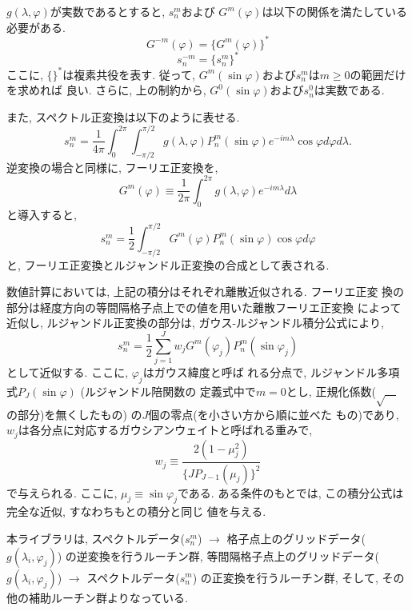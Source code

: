 \documentclass[a4j]{jarticle}
\begin{document}
$g(\lambda,\varphi)$が実数であるとすると, $s^m_n$および
$G^m(\varphi)$は以下の関係を満たしている必要がある.
\begin{equation}
G^{-m}(\varphi)=\{G^m(\varphi)\}^{*}
\end{equation}
\begin{equation}
s^{-m}_n=\{s^m_n\}^{*}
\end{equation}
ここに, $\{ \}^{*}$は複素共役を表す.
従って, $G^m(\sin\varphi)$および$s^m_n$は$m\ge 0$の範囲だけを求めれば
良い. さらに, 上の制約から, $G^0(\sin\varphi)$および$s^0_n$は実数である.

また, スペクトル正変換は以下のように表せる.
\begin{equation}
s^m_n=\frac1{4\pi}\int^{2\pi}_0\int^{\pi/2}_{-\pi/2}
g(\lambda,\varphi)P^m_n(\sin\varphi)e^{-im\lambda}\cos\varphi d\varphi
d\lambda .
\end{equation}
逆変換の場合と同様に, フーリエ正変換を,
\begin{equation}
G^m(\varphi)\equiv\frac1{2\pi}\int^{2\pi}_0
g(\lambda,\varphi)e^{-im\lambda}d\lambda
\end{equation}
と導入すると, 
\begin{equation}
s^m_n=\frac12\int^{\pi/2}_{-\pi/2}G^m(\varphi)P^m_n(\sin\varphi)\cos\varphi
d\varphi
\end{equation}
と, フーリエ正変換とルジャンドル正変換の合成として表される.

数値計算においては, 上記の積分はそれぞれ離散近似される. フーリエ正変
換の部分は経度方向の等間隔格子点上での値を用いた離散フーリエ正変換
によって近似し,
ルジャンドル正変換の部分は, ガウス-ルジャンドル積分公式により,
\begin{equation}
s^m_n=\frac12\sum^J_{j=1}w_jG^m(\varphi_j)P^m_n(\sin\varphi_j)
\end{equation}
として近似する. ここに, $\varphi_j$はガウス緯度と呼ば
れる分点で, ルジャンドル多項式$P_J(\sin\varphi)$ (ルジャンドル陪関数の
定義式中で$m=0$とし, 正規化係数($\sqrt{\quad}$の部分)を無くしたもの)
の$J$個の零点(を小さい方から順に並べた
もの)であり, $w_j$は各分点に対応するガウシアンウェイトと呼ばれる重みで,
\begin{equation}
w_j\equiv\frac{2(1-\mu_j^2)}{\{JP_{J-1}(\mu_j)\}^2}
\end{equation}
で与えられる. ここに, $\mu_j\equiv\sin\varphi_j$である.
ある条件のもとでは, この積分公式は完全な近似, すなわちもとの積分と同じ
値を与える.

本ライブラリは, 
スペクトルデータ($s^m_n$) 
$\to$ 格子点上のグリッドデータ($g(\lambda_i,\varphi_j)$) 
の逆変換を行うルーチン群,
等間隔格子点上のグリッドデータ($g(\lambda_i,\varphi_j)$) 
$\to$ スペクトルデータ($s^m_n$) 
の正変換を行うルーチン群,
そして, その他の補助ルーチン群よりなっている.
\end{document}
